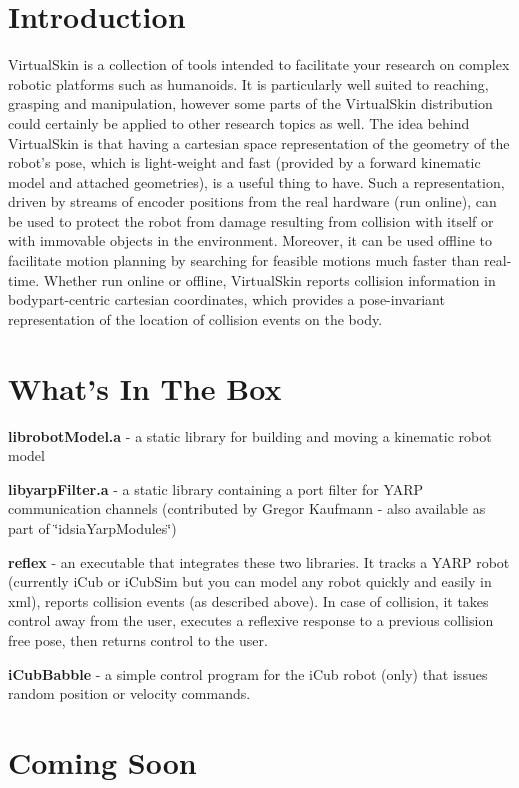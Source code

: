 \hypertarget{index_intro}{}\section{Introduction}\label{index_intro}
VirtualSkin is a collection of tools intended to facilitate your research on complex robotic platforms such as humanoids. It is particularly well suited to reaching, grasping and manipulation, however some parts of the VirtualSkin distribution could certainly be applied to other research topics as well. The idea behind VirtualSkin is that having a cartesian space representation of the geometry of the robot's pose, which is light-\/weight and fast (provided by a forward kinematic model and attached geometries), is a useful thing to have. Such a representation, driven by streams of encoder positions from the real hardware (run online), can be used to protect the robot from damage resulting from collision with itself or with immovable objects in the environment. Moreover, it can be used offline to facilitate motion planning by searching for feasible motions much faster than real-\/time. Whether run online or offline, VirtualSkin reports collision information in bodypart-\/centric cartesian coordinates, which provides a pose-\/invariant representation of the location of collision events on the body.\hypertarget{index_contents}{}\section{What's In The Box}\label{index_contents}

\begin{DoxyItemize}
\item {\bfseries librobotModel.a} -\/ a static library for building and moving a kinematic robot model
\item {\bfseries libyarpFilter.a} -\/ a static library containing a port filter for YARP communication channels (contributed by Gregor Kaufmann -\/ also available as part of \char`\"{}idsiaYarpModules\char`\"{})
\item {\bfseries reflex} -\/ an executable that integrates these two libraries. It tracks a YARP robot (currently iCub or iCubSim but you can model any robot quickly and easily in xml), reports collision events (as described above). In case of collision, it takes control away from the user, executes a reflexive response to a previous collision free pose, then returns control to the user.
\item {\bfseries iCubBabble} -\/ a simple control program for the iCub robot (only) that issues random position or velocity commands.
\end{DoxyItemize}\hypertarget{index_upcoming}{}\section{Coming Soon}\label{index_upcoming}

